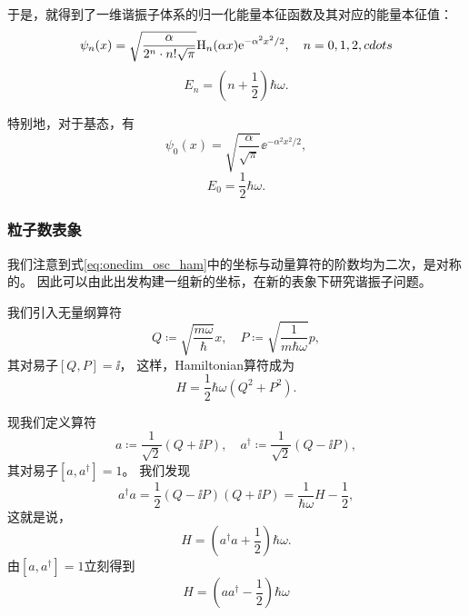 \begin{tcolorbox}
于是，就得到了一维谐振子体系的归一化能量本征函数及其对应的能量本征值：
\begin{equation}
    \label{eq:onedim_osc_coord_wfn}
    \psi_n(x) = \sqrt{\frac{\alpha}{2^n\cdot n! \sqrt{\pi}}} \mathrm{H}_n(\alpha x) \mathrm{e}^{-\alpha^2 x^2/2}, \quad n=0,1,2,cdots
\end{equation}
\begin{equation}
    E_n = \left(n+\frac12\right) \hbar\omega.
\end{equation}

特别地，对于基态，有
\begin{equation}
    \psi_0(x) = \sqrt{\frac{\alpha}{\sqrt{\pi}}} \ee^{-\alpha^2 x^2/2},
\end{equation}
\begin{equation}
    E_0 = \frac12 \hbar\omega.
\end{equation}
\end{tcolorbox}


\subsubsection{粒子数表象}

我们注意到式\eqref{eq:onedim_osc_ham}中的坐标与动量算符的阶数均为二次，是对称的。
因此可以由此出发构建一组新的坐标，在新的表象下研究谐振子问题。

我们引入无量纲算符
\begin{equation}
    Q \coloneq \sqrt{\frac{m\omega}{\hbar}} x ,\quad P \coloneq \sqrt{\frac{1}{m\hbar\omega}} p,
\end{equation}
其对易子$[Q,P]=\ii$，
这样，Hamiltonian算符成为
\begin{equation}
    H = \frac12 \hbar\omega (Q^2+P^2).
\end{equation}

现我们定义算符
\begin{equation}
    a \coloneq \frac{1}{\sqrt{2}} (Q+\ii P) ,\quad a^\dag \coloneq \frac{1}{\sqrt{2}} (Q-\ii P),
\end{equation}
其对易子$[a,a^\dag]=1$。
我们发现
\begin{equation}
    a^\dag a = \frac12 (Q-\ii P)(Q+\ii P) = \frac{1}{\hbar\omega} H - \frac12,
\end{equation}
这就是说，
\begin{equation}
    H = (a^\dag a+\frac12)\hbar\omega.
\end{equation}
由$[a,a^\dag]=1$立刻得到
\begin{equation}
    H = (a a^\dag-\frac12)\hbar\omega
\end{equation}

